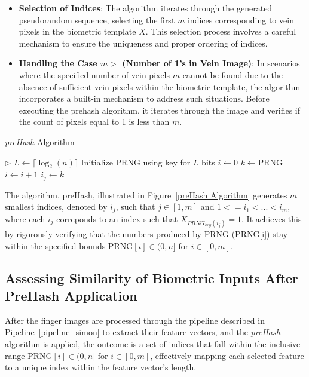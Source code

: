 \begin{itemize}
    \item \textbf{Selection of Indices}: The algorithm iterates through the generated pseudorandom sequence, selecting the first \(m\) indices corresponding to vein pixels in the biometric template \(X\). This selection process involves a careful mechanism to ensure the uniqueness and proper ordering of indices.

    \item \textbf{Handling the Case \(m >\) (Number of 1's in Vein Image)}: In scenarios where the specified number of vein pixels \(m\) cannot be found due to the absence of sufficient vein pixels within the biometric template, the algorithm incorporates a built-in mechanism to address such situations. Before executing the prehash algorithm, it iterates through the image and verifies if the count of pixels equal to 1 is less than \(m\).

\end{itemize}


\begin{algorithm}
\begin{algorithmic}[1]
\caption{\textit{preHash} Algorithm}
\label{preHash Algorithm}
\State \hfill $\triangleright$ $L \gets \lceil \log_2(n) \rceil$
\State Initialize PRNG using key for $L$ bits
\State $i \gets 0$
    \Repeat
        \Repeat
            \State $k \gets \text{PRNG}$
        \State $i \gets i + 1$
    \State $i_j \gets k$
    \EndFor
\State {}
\EndFunction
\end{algorithmic}
\end{algorithm}

The algorithm, preHash, illustrated in Figure~\ref{preHash Algorithm} generates \(m\) smallest indices, denoted by \(i_j\), such that \(j\in{[1, m]} \) and \(1 <= i_1 < ... < i_m\), where each \(i_j\) correponds to an index such that \(X_{PRNG_{key}(i_j)} = 1\). It achieves this by rigorously verifying that the numbers produced by PRNG (PRNG[i]) stay within the specified bounds \(\text{PRNG}[i] \in (0, n] \text{ for } i \in [0, m]\).

\subsection{Assessing Similarity of Biometric Inputs After PreHash Application}
\label{sec:mu}

After the finger images are processed through the pipeline described in Pipeline~\ref{pipeline_simon} to extract their feature vectors, and the \textit{preHash} algorithm is applied, the outcome is a set of indices that fall within the inclusive range \(\text{PRNG}[i] \in (0, n] \text{ for } i \in [0, m]\), effectively mapping each selected feature to a unique index within the feature vector's length.

